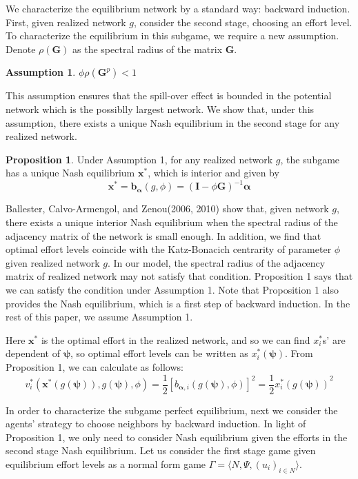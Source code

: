 \documentclass[12pt]{article}
\theoremstyle{definition}
\newtheorem{proposition}{Proposition}
\newtheorem{assumption}{Assumption}
\newcommand{\bm}[1]{\boldsymbol{#1}}
\begin{document}
We characterize the equilibrium network by a standard way: backward induction.
First, given realized network $g$, consider the second stage, choosing an effort level.
To characterize the equilibrium in this subgame, we require a new assumption.
Denote $\rho (\bm{G})$ as the spectral radius of the matrix $\bm{G}$.

\begin{assumption}
$\phi \rho(\bm{G}^p) < 1$
\end{assumption}

This assumption ensures that the spill-over effect is bounded in the potential network which is the possiblly largest network.
We show that, under this assumption, there exists a unique Nash equilibrium in the second stage for any realized network.

\begin{proposition}
Under Assumption 1, for any realized network $g$, the subgame has a unique Nash equilibrium $\bm{x}^*$, which is interior and given by
\[ \bm{x}^* = \bm{b}_{\bm{\alpha}}(g, \phi) = {(\bm{I} - \phi \bm{G})}^{-1} \bm{\alpha} \]
\end{proposition}

Ballester, Calvo-Armengol, and Zenou(2006, 2010) show that, given network $g$, there exists a unique interior Nash equilibrium when the spectral radius of the adjacency matrix of the network is small enough.
In addition, we find that optimal effort levels coincide with the Katz-Bonacich centrarity of parameter $\phi$ given realized network $g$.
In our model, the spectral radius of the adjacency matrix of realized network may not satisfy that condition.
Proposition 1 says that we can satisfy the condition under Assumption 1.
Note that Proposition 1 also provides the Nash equilibrium, which is a first step of backward induction.
In the rest of this paper, we assume Assumption 1.

Here $\bm{x}^*$ is the optimal effort in the realized network, and so we can find $x_i^*$s' are dependent of $\bm{\psi}$, so optimal effort levels can be written as $x_i^*(\bm{\psi})$.
From Proposition 1, we can calculate as follows:
\begin{equation}
	\label{opteff}
	v_i^*(\bm{x}^*(g(\bm{\psi})), g(\bm{\psi}), \phi) = \frac{1}{2} {[b_{\bm{\alpha}, i}(g(\bm{\psi}), \phi)]}^2 = \frac{1}{2} {x_i^*(g(\bm{\psi}))}^2
\end{equation}

In order to characterize the subgame perfect equilibrium, next we consider the agents' strategy to choose neighbors by backward induction.
In light of Proposition 1, we only need to consider Nash equilibrium given the efforts in the second stage Nash equilibrium.
Let us consider the first stage game given equilibrium effort levels as a normal form game $\Gamma = \langle N, \Psi, {(u_i)}_{i \in N} \rangle$.
\end{document}
